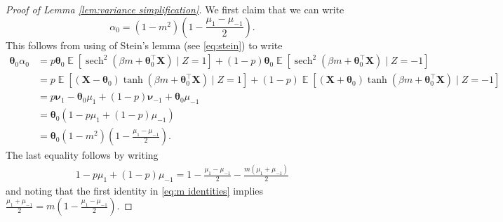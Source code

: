 \documentclass[preprint,reqno]{imsart}
\newcommand{\ttheta}{\boldsymbol{\theta}}
\DeclareMathOperator{\sech}{sech}
\DeclareMathOperator{\EE}{\mathbb{E}}
\newcommand{\X}{\mathbf{X}}
\begin{document}
\begin{appendix}
\begin{proof}[Proof of Lemma \ref{lem:variance simplification}]
We first claim that we can write
\begin{equation}\label{eq:alpha_0}
    \alpha_0 = (1-m^2) (1 - \frac{\mu_1 - \mu_{-1}}{2}).
\end{equation}
This follows from using of Stein's lemma (see \eqref{eq:stein}) to write
\begin{align*}
    \ttheta_0 \alpha_0 &= p \ttheta_0 \EE [\sech^2(\beta m + \ttheta_0^{\top} \X) \mid Z=1] + (1-p) \ttheta_0 \EE [\sech^2(\beta m + \ttheta_0^{\top} \X) \mid Z=-1] \\
    &= p \EE [(\X - \ttheta_0) \tanh(\beta m + \ttheta_0^{\top} \X) \mid Z=1] + (1-p) \EE [(\X + \ttheta_0) \tanh(\beta m + \ttheta_0^{\top} \X) \mid Z=-1] \\
    &= p \boldsymbol{\nu}_1 - \ttheta_0 \mu_1 + (1-p) \boldsymbol{\nu}_{-1} + \ttheta_0 \mu_{-1} \\
    &= \ttheta_0 (1 - p \mu_1 + (1-p) \mu_{-1}) \\
    &= \ttheta_0 (1-m^2) (1 - \frac{\mu_1 - \mu_{-1}}{2}).
\end{align*}
The last equality follows by writing
\begin{align*}
    1 - p \mu_1 + (1-p) \mu_{-1} = 1 - \frac{\mu_1-\mu_{-1}}{2} - \frac{m(\mu_1 + \mu_{-1})}{2}
\end{align*}
and noting that the first identity in \eqref{eq:m identities} implies $\frac{\mu_1 + \mu_{-1}}{2} = m(1-\frac{\mu_1-\mu_{-1}}{2})$.


\end{proof}
\end{appendix}
\end{document}
